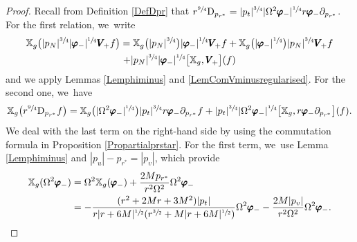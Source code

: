 \documentclass[JEP,XML,SOM,Unicode,published]{cedram}
\theoremstyle{plain}
\theoremstyle{definition}
\newcommand\T{{\mathbb{X}}}
\begin{document}
\begin{proof}
Recall from Definition \ref{DefDpr} that $r^{\sfrac{9}{4}} \mathrm{D}_{p_{r^*}} = |p_t|^{\sfrac{3}{4}} |\Omega^2 \pmb{\varphi}_-|^{\sfrac{1}{4}} r \pmb{\varphi}_- \partial_{p_{r^*}}$. For the first relation, we~write
\begin{multline*}
\T_g \bigl(|p_N|^{\sfrac{3}{4}}|\pmb{\varphi}_-|^{\sfrac{1}{4}}\pmb{V}_{\! +} f \bigr) =\T_g \bigl(|p_N|^{\sfrac{3}{4}} \bigr)|\pmb{\varphi}_-|^{\sfrac{1}{4}}\pmb{V}_{\! +} f+\T_g \bigl(|\pmb{\varphi}_-|^{\sfrac{1}{4}} \bigr) |p_N|^{\sfrac{3}{4}} \pmb{V}_{\! +} f \\
+ |p_N|^{\sfrac{3}{4}} |\pmb{\varphi}_-|^{\sfrac{1}{4}} \bigl[\T_g,\pmb{V}_{\! +} \bigr](f)
\end{multline*}
and we apply Lemmas \ref{Lemphiminus} and \ref{LemComVminusregularised}. For the second one, we~have
\[
\T_g \bigl(r^{\sfrac{9}{4}} \mathrm{D}_{p_{r^*}} f \bigr) = \T_g \bigl(|\Omega^2 \pmb{\varphi}_-|^{\sfrac{1}{4}} \bigr) |p_t|^{\sfrac{3}{4}} r \pmb{\varphi}_- \partial_{p_{r^*}}f + |p_t|^{\sfrac{3}{4}} |\Omega^2 \pmb{\varphi}_-|^{\sfrac{1}{4}} \bigl[\T_g, r \pmb{\varphi}_- \partial_{p_{r^*}} \bigr](f).
\]
We deal with the last term on the right-hand side by using the commutation formula in Proposition \ref{Propartialprstar}. For the first term, we~use Lemma \ref{Lemphiminus} and $|p_u|-p_{r^*}=|p_v|$, which provide
\begin{equation}\label{eq:phitilde}
\begin{aligned}
\T_g(\Omega^2 \pmb{\varphi}_-) & = \Omega^2\T_g(\pmb{\varphi}_-)+\frac{2Mp_{r^*}}{r^2 \Omega^2}\Omega^2 \pmb{\varphi}_- \\
& = -\frac{(r^2+2Mr+3M^2)|p_t|}{r|r+6M|^{\sfrac{1}{2}}(r^{\sfrac{3}{2}}+M|r+6M|^{\sfrac{1}{2}}) } \Omega^2 \pmb{\varphi}_--\frac{2M|p_v|}{r^2 \Omega^2} \Omega^2 \pmb{\varphi}_-. 
\end{aligned}\qedhere
\end{equation}
\end{proof}
\end{document}

